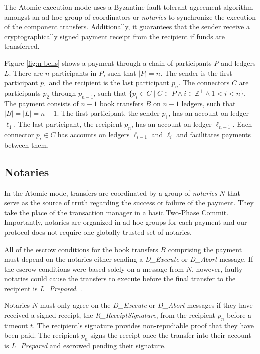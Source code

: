 \documentclass[letterpaper,twocolumn,10pt]{article}
\begin{document}
The Atomic execution mode uses a Byzantine fault-tolerant agreement algorithm amongst an ad-hoc group of coordinators or \textit{notaries} to synchronize the execution of the component transfers. Additionally, it guarantees that the sender receive a cryptographically signed payment receipt from the recipient if funds are transferred.

Figure \ref{fig:n-bells} shows a payment through a chain of participants $P$ and ledgers $L$. There are $n$ participants in $P$, such that $ \left\vert{P}\right\vert = n $. The sender is the first participant $p_1$ and the recipient is the last participant $p_n$. The connectors $C$ are participants $p_2$ through $p_{n-1}$, such that $ \{ p_i \in C \mid C \subset P \land i \in \mathbb{Z}^+ \land 1 < i < n \} $. The payment consists of $n-1$ book transfers $B$ on $n-1$ ledgers, such that $\left\vert{B}\right\vert = \left\vert{L}\right\vert = n-1 $. The first participant, the sender $p_1$, has an account on ledger $\ell_1$. The last participant, the recipient $p_n$, has an account on ledger $\ell_{n-1}$. Each connector $p_i \in C$ has accounts on ledgers $\ell_{i-1}$ and $\ell_i$ and facilitates payments between them.


\subsection{Notaries}

In the Atomic mode, transfers are coordinated by a group of \textit{notaries} $N$ that serve as the source of truth regarding the success or failure of the payment. They take the place of the transaction manager in a basic Two-Phase Commit. Importantly, notaries are organized in ad-hoc groups for each payment and our protocol does not require one globally trusted set of notaries.

All of the escrow conditions for the book transfers $B$ comprising the payment must depend on the notaries either sending a \textit{D\_Execute} or \textit{D\_Abort} message. If the escrow conditions were based solely on a message from $N$, however, faulty notaries could cause the transfers to execute before the final transfer to the recipient is \textit{L\_Prepared}. \cite{dolev1983authenticated}.

Notaries $N$ must only agree on the \textit{D\_Execute} or \textit{D\_Abort} messages if they have received a signed receipt, the \textit{R\_ReceiptSignature}, from the recipient $p_n$ before a timeout $t$. The recipient's signature provides non-repudiable proof that they have been paid. The recipient $p_n$ signs the receipt once the transfer into their account is \textit{L\_Prepared} and escrowed pending their signature.
\end{document}
